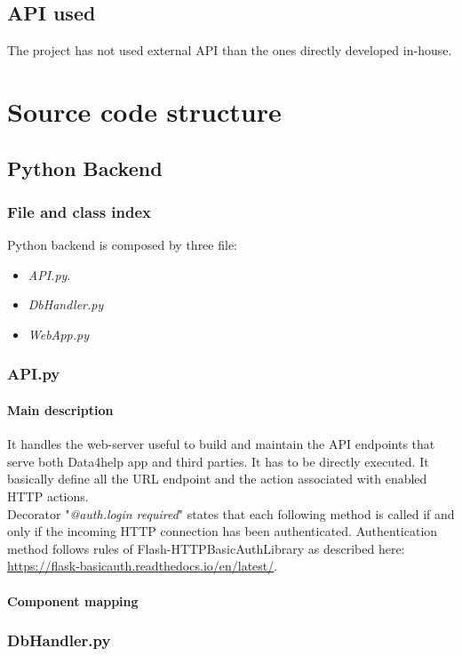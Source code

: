 \documentclass{article}
\begin{document}
\subsection{API used}
The project has not used external API than the ones directly developed in-house.

\section{Source code structure}
\subsection{Python Backend}
\subsubsection{File and class index}
Python backend is composed by three file:
\begin{itemize}
	\item \textit{API.py}.
	\item \textit{DbHandler.py}
	\item \textit{WebApp.py}
\end{itemize}

\subsubsection{API.py}
\paragraph{Main description}
 It handles the web-server useful to build and maintain the API endpoints that serve both Data4help app and third parties. It has to be directly executed. It basically define all the URL endpoint and the action associated with enabled HTTP actions.\\
 Decorator "\textit{@auth.login required}" states that each following method is called if and only if the incoming HTTP connection has been authenticated. Authentication method follows rules of Flash-HTTPBasicAuthLibrary as described here: \url{https://flask-basicauth.readthedocs.io/en/latest/}.
 \paragraph{Component mapping}
 
 \subsubsection{DbHandler.py}
\end{document}
